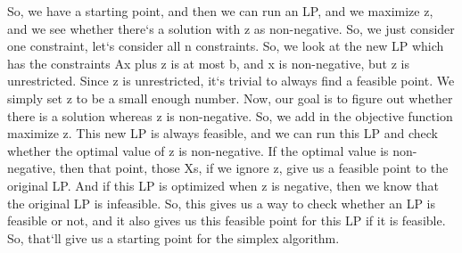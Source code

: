 So, we have a starting point, and then we can run an LP, and we maximize z, and we see whether there`s a solution with z as non-negative.
So, we just consider one constraint, let`s consider all n constraints.
So, we look at the new LP which has the constraints Ax plus z is at most b, and x is non-negative, but z is unrestricted.
Since z is unrestricted, it`s trivial to always find a feasible point.
We simply set z to be a small enough number.
Now, our goal is to figure out whether there is a solution whereas z is non-negative.
So, we add in the objective function maximize z.
This new LP is always feasible, and we can run this LP and check whether the optimal value of z is non-negative.
If the optimal value is non-negative, then that point, those Xs, if we ignore z, give us a feasible point to the original LP\@.
And if this LP is optimized when z is negative, then we know that the original LP is infeasible.
So, this gives us a way to check whether an LP is feasible or not, and it also gives us this feasible point for this LP if it is feasible.
So, that`ll give us a starting point for the simplex algorithm.

